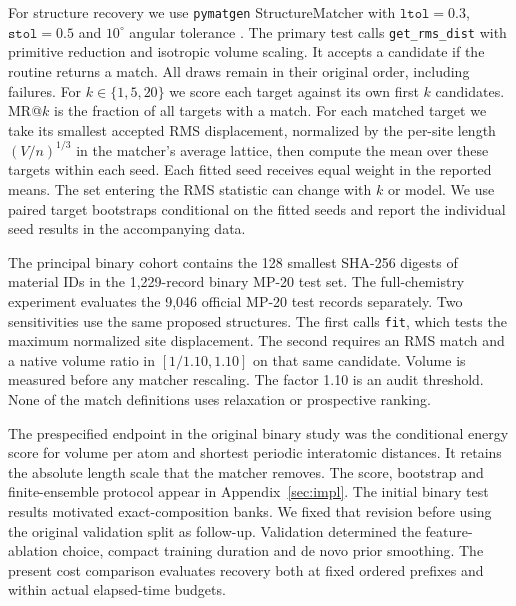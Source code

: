 \documentclass[10pt]{article}
\begin{document}
For structure recovery we use \texttt{pymatgen} StructureMatcher with $\texttt{ltol}=0.3$, $\texttt{stol}=0.5$ and $10^\circ$ angular tolerance \cite{pymatgen,diffcsp}. The primary test calls \texttt{get\_rms\_dist} with primitive reduction and isotropic volume scaling. It accepts a candidate if the routine returns a match. All draws remain in their original order, including failures. For $k\in\{1,5,20\}$ we score each target against its own first $k$ candidates. MR@$k$ is the fraction of all targets with a match. For each matched target we take its smallest accepted RMS displacement, normalized by the per-site length $(V/n)^{1/3}$ in the matcher's average lattice, then compute the mean over these targets within each seed. Each fitted seed receives equal weight in the reported means. The set entering the RMS statistic can change with $k$ or model. We use paired target bootstraps conditional on the fitted seeds and report the individual seed results in the accompanying data.

The principal binary cohort contains the 128 smallest SHA-256 digests of material IDs in the 1,229-record binary MP-20 test set. The full-chemistry experiment evaluates the 9,046 official MP-20 test records separately. Two sensitivities use the same proposed structures. The first calls \texttt{fit}, which tests the maximum normalized site displacement. The second requires an RMS match and a native volume ratio in $[1/1.10,1.10]$ on that same candidate. Volume is measured before any matcher rescaling. The factor 1.10 is an audit threshold. None of the match definitions uses relaxation or prospective ranking.

The prespecified endpoint in the original binary study was the conditional energy score for volume per atom and shortest periodic interatomic distances. It retains the absolute length scale that the matcher removes. The score, bootstrap and finite-ensemble protocol appear in Appendix~\ref{sec:impl}. The initial binary test results motivated exact-composition banks. We fixed that revision before using the original validation split as follow-up. Validation determined the feature-ablation choice, compact training duration and de novo prior smoothing. The present cost comparison evaluates recovery both at fixed ordered prefixes and within actual elapsed-time budgets.


\end{document}
